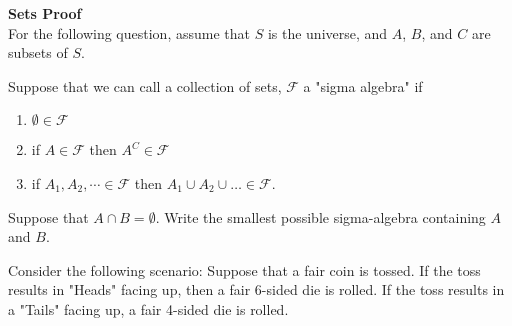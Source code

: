\documentclass[addpoints]{examsetup}
\begin{document}
\examCoverPage

\begin{questions}


\question \textbf{Sets Proof} \\ For the following question, assume that $S$ is the universe, and $A$, $B$, and $C$ are subsets of $S$.


\newpage

\question[8]
   Suppose that we can call a collection of sets, $\mathcal{F}$ a "sigma algebra" if 
   \begin{enumerate}
      \item $\emptyset \in \mathcal{F}$
      \item if $A \in \mathcal{F}$ then $A^{C} \in \mathcal{F}$
      \item if $A_1, A_2, \cdots \in \mathcal{F}$ then $A_1 \cup A_2 \cup \ldots \in \mathcal{F}$.
   \end{enumerate}
   Suppose that $A \cap B = \emptyset$. Write the smallest possible sigma-algebra containing $A$ and $B$.

\newpage
\question
Consider the following scenario: Suppose that a fair coin is tossed. If the toss results in "Heads" facing up, then a fair 6-sided die is rolled. If the toss results in a "Tails" facing up, a fair 4-sided die is rolled.

\end{questions}
\end{document}
